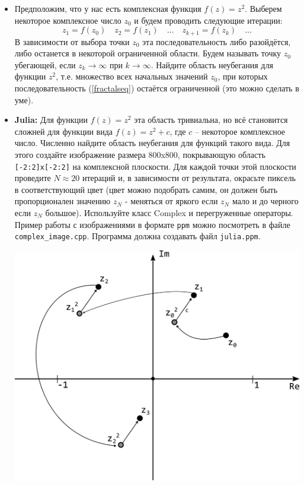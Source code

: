 \documentclass{article}
\begin{document}
\begin{itemize}
\item Предположим, что у нас есть комплексная функция $f(z) = z^2$. Выберем некоторое комплексное число $z_0$ и будем проводить следующие итерации: 
\begin{equation}
\label{fractalseq}
z_1 = f(z_0)\quad z_2 = f(z_1)\quad ...\quad z_{k+1} = f(z_k)\quad ...
\end{equation}
В зависимости от выбора точки $z_0$ эта последовательность либо разойдётся, либо останется в некоторой ограниченной области. Будем называть точку $z_0$ убегающей, если $z_k \rightarrow \infty$ при $k \rightarrow \infty$. Найдите область неубегания для функции $z^2$, т.е. множество всех начальных значений $z_0$, при которых последовательность (\ref{fractalseq}) остаётся ограниченной (это можно сделать в уме). \\

\item \textbf{Julia:} Для функции $f(z) = z^2$ эта область тривиальна, но всё становится сложней для функции вида $f(z) = z^2 + c$, где $c$ -- некоторое комплексное число. Численно найдите область неубегания для функций такого вида. Для этого создайте изображение размера 800x800, покрывающую область \texttt{[-2:2]x[-2:2]} на комплексной плоскости. Для каждой точки этой плоскости проведите $N \approx 20$ итераций и, в зависимости от результата, окрасьте пиксель в соответствующий цвет (цвет можно подобрать самим, он должен быть пропорционален значению $z_N$ - меняться от яркого если $z_N$ мало и до черного если $z_N$ большое). Используйте класс Complex и перегруженные операторы. Пример работы с изображениями в формате \texttt{ppm} можно посмотреть в файле \texttt{complex\_image.cpp}. Программа должна создавать файл \texttt{julia.ppm}.

\begin{center}
\includegraphics[scale=0.7]{../images/complexplane.png}
\end{center}


\end{itemize}
\end{document}
